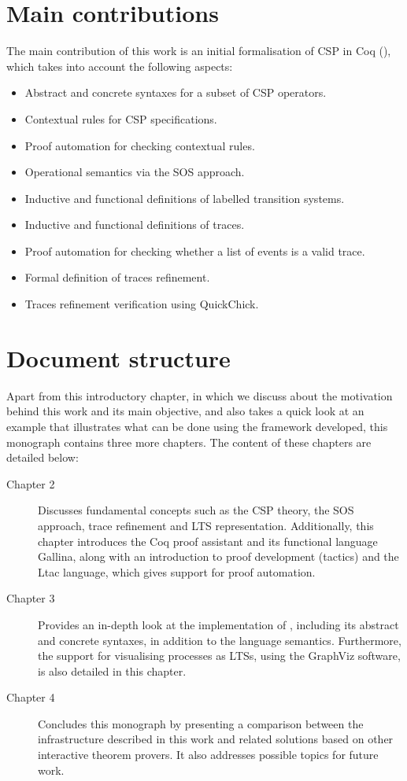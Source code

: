 \section{Main contributions}

The main contribution of this work is an initial formalisation of CSP in Coq (\CSPcoq{}), which takes into account the following aspects:

\begin{itemize}
	\item Abstract and concrete syntaxes for a subset of CSP operators.
	\item Contextual rules for CSP specifications.
	\item Proof automation for checking contextual rules.
	\item Operational semantics via the SOS approach.
	\item Inductive and functional definitions of labelled transition systems.
	\item Inductive and functional definitions of traces.
	\item Proof automation for checking whether a list of events is a valid trace.
	\item Formal definition of traces refinement.
	\item Traces refinement verification using QuickChick.
\end{itemize}

\section{Document structure}

Apart from this introductory chapter, in which we discuss about the motivation behind this work and its main objective, and also takes a quick look at an example that illustrates what can be done using the framework developed, this monograph contains three more chapters. The content of these chapters are detailed below:

\begin{description}
	\item [Chapter 2] Discusses fundamental concepts such as the CSP theory, the SOS approach, trace refinement and LTS representation. Additionally, this chapter introduces the Coq proof assistant and its functional language Gallina, along with an introduction to proof development (tactics) and the Ltac language, which gives support for proof automation.
	\item [Chapter 3] Provides an in-depth look at the implementation of \CSPcoq{}, including its abstract and concrete syntaxes, in addition to the language semantics. Furthermore, the support for visualising processes as LTSs, using the GraphViz software, is also detailed in this chapter.
	\item [Chapter 4] Concludes this monograph by presenting a comparison between the infrastructure described in this work and related solutions based on other interactive theorem provers. It also addresses possible topics for future work.
\end{description}